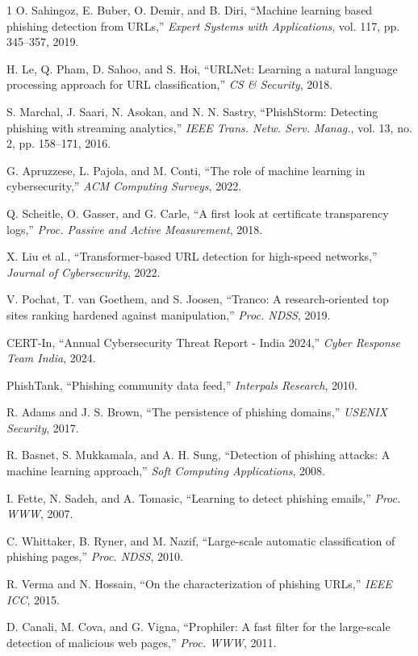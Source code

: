 \documentclass[journal]{IEEEtran}
\begin{document}
\begin{thebibliography}{1}
O. Sahingoz, E. Buber, O. Demir, and B. Diri, ``Machine learning based phishing detection from URLs,'' \textit{Expert Systems with Applications}, vol. 117, pp. 345--357, 2019.

H. Le, Q. Pham, D. Sahoo, and S. Hoi, ``URLNet: Learning a natural language processing approach for URL classification,'' \textit{CS & Security}, 2018.

S. Marchal, J. Saari, N. Asokan, and N. N. Sastry, ``PhishStorm: Detecting phishing with streaming analytics,'' \textit{IEEE Trans. Netw. Serv. Manag.}, vol. 13, no. 2, pp. 158--171, 2016.

G. Apruzzese, L. Pajola, and M. Conti, ``The role of machine learning in cybersecurity,'' \textit{ACM Computing Surveys}, 2022.

Q. Scheitle, O. Gasser, and G. Carle, ``A first look at certificate transparency logs,'' \textit{Proc. Passive and Active Measurement}, 2018.

X. Liu et al., ``Transformer-based URL detection for high-speed networks,'' \textit{Journal of Cybersecurity}, 2022.

V. Pochat, T. van Goethem, and S. Joosen, ``Tranco: A research-oriented top sites ranking hardened against manipulation,'' \textit{Proc. NDSS}, 2019.

CERT-In, ``Annual Cybersecurity Threat Report - India 2024,'' \textit{Cyber Response Team India}, 2024.

PhishTank, ``Phishing community data feed,'' \textit{Interpals Research}, 2010.

R. Adams and J. S. Brown, ``The persistence of phishing domains,'' \textit{USENIX Security}, 2017.

R. Basnet, S. Mukkamala, and A. H. Sung, ``Detection of phishing attacks: A machine learning approach,'' \textit{Soft Computing Applications}, 2008.

I. Fette, N. Sadeh, and A. Tomasic, ``Learning to detect phishing emails,'' \textit{Proc. WWW}, 2007.

C. Whittaker, B. Ryner, and M. Nazif, ``Large-scale automatic classification of phishing pages,'' \textit{Proc. NDSS}, 2010.

R. Verma and N. Hossain, ``On the characterization of phishing URLs,'' \textit{IEEE ICC}, 2015.

D. Canali, M. Cova, and G. Vigna, ``Prophiler: A fast filter for the large-scale detection of malicious web pages,'' \textit{Proc. WWW}, 2011.

\end{thebibliography}
\end{document}
